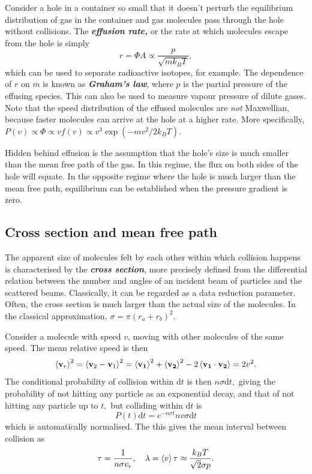 \documentclass{article}
\theoremstyle{nonumberplain}
\begin{document}
Consider a hole in a container so small that it doesn't perturb the equilibrium distribution of gas in the container and gas molecules pass through the hole without collisions. The \textit{\textbf{effusion rate,}} or the rate at which molecules escape from the hole is simply
\[
    r = \Phi A \propto \frac{p}{\sqrt{m k_B T}},
\] 
which can be used to separate radioactive isotopes, for example. The dependence of $r$ on $m$ is known as \textit{\textbf{Graham's law}}, where $p$ is the partial pressure of the effusing species. This can also be used to measure vapour pressure of dilute gases. 
Note that the speed distribution of the effused molecules are \textit{not} Maxwellian, because faster molecules can arrive at the hole at a higher rate. More specifically, $P(v) \propto \Phi \propto v f(v) \propto v^3 \exp(- m v^{2} / 2 k_B T).$

Hidden behind effusion is the assumption that the hole's size is much smaller than the mean free path of the gas. In this regime, the flux on both sides of the hole will equate. In the opposite regime where the hole is much larger than the mean free path, equilibrium can be established when the pressure gradient is zero. 

\subsection{Cross section and mean free path}
The apparent size of molecules felt by each other within which collision happens is characterised by the \textit{\textbf{cross section}}, more precisely defined from the differential relation between the number and angles of an incident beam of particles and the scattered beams. Classically, it can be regarded as a data reduction parameter. Often, the cross section is much larger than the actual size of the molecules. In the classical approximation, $\sigma = \pi (r_a + r_b)^{2}.$

Consider a molecule with speed $v$, moving with other molecules of the same speed. The mean relative speed is then 
\[
    \expval{\mathbf{v}_r}^{2} = \expval{\mathbf{v}_2 - \mathbf{v}_1}^{2} = \expval{\mathbf{v_1} }^{2} + \expval{\mathbf{v_2}}^2 - 2 \expval{\mathbf{v_1}\cdot \mathbf{v_2}} = 2v^{2}. 
\] 
The conditional probability of collision within $\mathrm{d} t$ is then $n \sigma \mathrm{d} t,$ giving the probability of not hitting any particle as an exponential decay, and that of not hitting any particle up to $t,$ but colliding within $\mathrm{d} t$ is 
\[
    P(t) \mathrm{d} t = e^{- n \sigma  t} n v \sigma \mathrm{d} t
\]
which is automatically normalised. The this gives the mean interval between collision as 
\[
    \tau = \frac{1}{n \sigma v_r}, \quad 
    \lambda = \expval{v} \tau  \approx \frac{k_B T}{\sqrt{2} \sigma p}. 
\]
\end{document}
